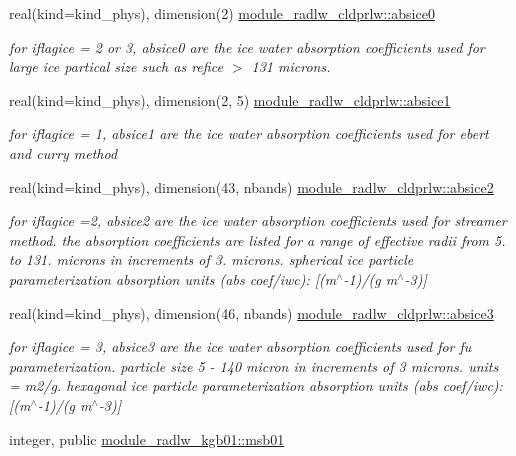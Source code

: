 \begin{DoxyCompactItemize}
real(kind=kind\+\_\+phys), dimension(2) \hyperlink{group__module__radlw__main_ga6610d37cab9ccd4de89237c5de536cfb}{module\+\_\+radlw\+\_\+cldprlw\+::absice0}
\begin{DoxyCompactList}\small\item\em for iflagice = 2 or 3, absice0 are the ice water absorption coefficients used for large ice partical size such as refice $>$ 131 microns. \end{DoxyCompactList}\item 
real(kind=kind\+\_\+phys), dimension(2, 5) \hyperlink{group__module__radlw__main_ga3b86ff9d6791d95170d3b3ab61cd8291}{module\+\_\+radlw\+\_\+cldprlw\+::absice1}
\begin{DoxyCompactList}\small\item\em for iflagice = 1, absice1 are the ice water absorption coefficients used for ebert and curry method \end{DoxyCompactList}\item 
real(kind=kind\+\_\+phys), dimension(43, nbands) \hyperlink{group__module__radlw__main_gad2238686c0e6d1c5d74bcfdde1542e1d}{module\+\_\+radlw\+\_\+cldprlw\+::absice2}
\begin{DoxyCompactList}\small\item\em for iflagice =2, absice2 are the ice water absorption coefficients used for streamer method. the absorption coefficients are listed for a range of effective radii from 5. to 131. microns in increments of 3. microns. spherical ice particle parameterization absorption units (abs coef/iwc)\+: \mbox{[}(m$^\wedge$-\/1)/(g m$^\wedge$-\/3)\mbox{]} \end{DoxyCompactList}\item 
real(kind=kind\+\_\+phys), dimension(46, nbands) \hyperlink{group__module__radlw__main_ga3aa04541d0b809367f88ef8aa0eafdbb}{module\+\_\+radlw\+\_\+cldprlw\+::absice3}
\begin{DoxyCompactList}\small\item\em for iflagice = 3, absice3 are the ice water absorption coefficients used for fu parameterization. particle size 5 -\/ 140 micron in increments of 3 microns. units = m2/g. hexagonal ice particle parameterization absorption units (abs coef/iwc)\+: \mbox{[}(m$^\wedge$-\/1)/(g m$^\wedge$-\/3)\mbox{]} \end{DoxyCompactList}\item 
integer, public \hyperlink{group__module__radlw__main_gae34d953adc793ad27a294864e3e0e354}{module\+\_\+radlw\+\_\+kgb01\+::msb01}
\item 

\end{DoxyCompactItemize}
